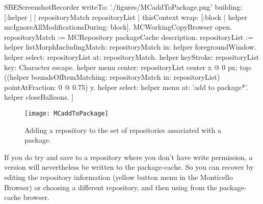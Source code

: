\documentclass[a4paper,10pt,twoside]{book}
\begin{document}
\begin{ExecuteSmalltalkScript}
SBEScreenshotRecorder writeTo: './figures/MCaddToPackage.png' building: [:helper |
	| repositoryMatch repositoryList |
	thisContext wrap: [:block | helper mcIgnoreAllModificationsDuring: block].
	MCWorkingCopyBrowser open.
	repositoryMatch := MCRepository packageCache description.
	repositoryList := helper listMorphIncludingMatch: repositoryMatch in: helper foregroundWindow.
	helper select: repositoryList at: repositoryMatch.
	helper keyStroke: repositoryList key: Character escape.
	helper menu
		center: repositoryList center x @ 0 px;
		top: ((helper boundsOfItemMatching: repositoryMatch in: repositoryList)
			pointAtFraction: 0 @ 0.75) y.
	helper select: helper menu at: 'add to package*'.
	helper closeBalloons.
]
\end{ExecuteSmalltalkScript}
\begin{figure}[tbp]
	\begin{center}
		\texttt{[image: MCaddToPackage]}
	\end{center}
	\caption{Adding a repository to the set of repositories associated with a package.}
	\label{fig:associateRepository}
\end{figure}

If you do try and save to a repository where you don't have write permission, a version will nevertheless be written to the package-cache.
So you can recover by editing the repository information (yellow button menu in the Monticello Browser) or choosing a different repository, and then using  from the package-cache browser.
\end{document}
